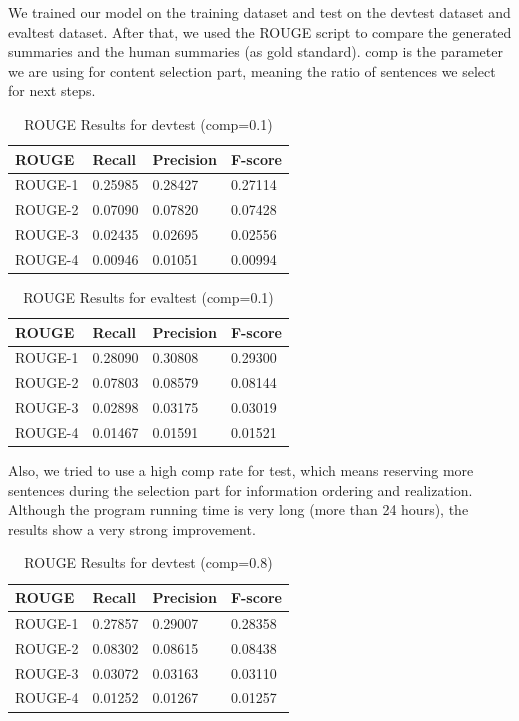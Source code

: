 \documentclass[11pt]{article}
\begin{document}
We trained our model on the training dataset and test on the devtest dataset and evaltest dataset. After that, we used the ROUGE script to compare the generated summaries and the human summaries (as gold standard). comp is the parameter we are using for content selection part, meaning the ratio of sentences we select for next steps. 
\begin{table}[!ht]
\centering
\caption{ROUGE Results for devtest (comp=0.1)}
\begin{tabular}{|l|l|l|l|}
\hline
ROUGE   & Recall  & Precision & F-score \\ \hline
ROUGE-1 & 0.25985 & 0.28427   & 0.27114 \\ \hline
ROUGE-2 & 0.07090 & 0.07820   & 0.07428 \\ \hline
ROUGE-3 & 0.02435 & 0.02695   & 0.02556 \\ \hline
ROUGE-4 & 0.00946 & 0.01051   & 0.00994 \\ \hline
\end{tabular}
\end{table}
\begin{table}[!ht]
\centering
\caption{ROUGE Results for evaltest (comp=0.1)}
\begin{tabular}{|l|l|l|l|}
\hline
ROUGE   & Recall  & Precision & F-score \\ \hline
ROUGE-1 & 0.28090 & 0.30808   & 0.29300 \\ \hline
ROUGE-2 & 0.07803 & 0.08579   & 0.08144 \\ \hline
ROUGE-3 & 0.02898 & 0.03175   & 0.03019 \\ \hline
ROUGE-4 & 0.01467 & 0.01591   & 0.01521 \\ \hline
\end{tabular}
\end{table}
Also, we tried to use a high comp rate for test, which means reserving more sentences during the selection part for information ordering and realization. Although the program running time is very long (more than 24 hours), the results show a very strong improvement.\\
\begin{table}[!ht]
\centering
\caption{ROUGE Results for devtest (comp=0.8)}
\begin{tabular}{|l|l|l|l|}
\hline
ROUGE   & Recall  & Precision & F-score \\ \hline
ROUGE-1 & 0.27857 & 0.29007   & 0.28358 \\ \hline
ROUGE-2 & 0.08302 & 0.08615   & 0.08438 \\ \hline
ROUGE-3 & 0.03072 & 0.03163   & 0.03110 \\ \hline
ROUGE-4 & 0.01252 & 0.01267   & 0.01257 \\ \hline
\end{tabular}
\end{table}
\end{document}
